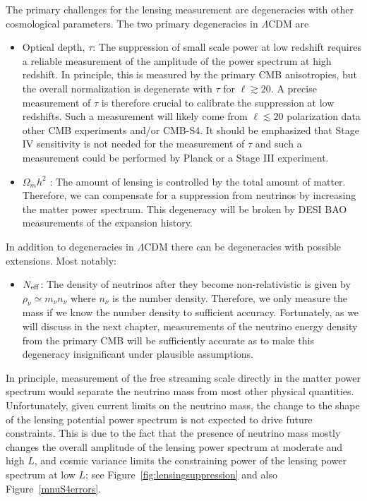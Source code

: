The primary challenges for the lensing measurement are degeneracies with other cosmological parameters.  The two primary degeneracies in $\Lambda$CDM are
\begin{itemize}
\item Optical depth, $\tau$: The suppression of small scale power at low redshift requires a reliable measurement of the amplitude of the power spectrum at high redshift.  In principle, this is measured by the primary CMB anisotropies, but the overall normalization is degenerate with $\tau$ for $\ell \gtrsim 20$.  A precise measurement of $\tau$ is therefore crucial to calibrate the suppression at low redshifts.  Such a measurement will likely come from $\ell \lesssim 20$ polarization data other CMB experiments and/or CMB-S4.  It should be emphasized that Stage IV sensitivity is not needed for the measurement of $\tau$ and such a measurement could be performed by Planck or a Stage III experiment.


\item $\Omega_m h^2$ : The amount of lensing is controlled by the total amount of matter.  Therefore, we can compensate for a suppression from neutrinos by increasing the matter power spectrum.  This degeneracy will be broken by DESI BAO measurements of the expansion history.
\end{itemize}
In addition to degeneracies in $\Lambda$CDM there can be degeneracies with possible extensions.  Most notably:
\begin{itemize}
\item $N_{\rm eff}$: The density of neutrinos after they become non-relativistic is given by $\rho_\nu \simeq m_\nu n_\nu$ where $n_\nu$ is the number density.  Therefore, we only measure the mass if we know the number density to sufficient accuracy.  Fortunately, as we will discuss in the next chapter, measurements of the neutrino energy density from the primary CMB will be sufficiently accurate as to make this degeneracy insignificant under plausible assumptions.
\end{itemize}
In principle, measurement of the free streaming scale directly in the matter power spectrum would separate the neutrino mass from most other physical quantities.  Unfortunately, given current limits on the neutrino mass, the change to the shape of the lensing potential power spectrum is not expected to drive future constraints.  This is due to the fact that the presence of neutrino mass mostly changes the overall amplitude of the lensing power spectrum at moderate and high $L$, and cosmic variance limits the constraining power of the lensing power spectrum at low $L$; see Figure~\ref{fig:lensingsuppression} and also Figure~\ref{mnuS4errors}.

